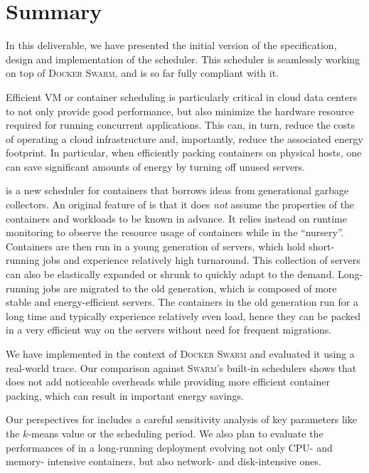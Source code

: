 
\chapter{Summary}
\label{chap:summ}

In this deliverable, we have presented the initial version of the specification, design and implementation of the \GP{} scheduler.
This scheduler is seamlessly working on top of \textsc{Docker Swarm}, and is so far fully compliant with it.

Efficient VM or container scheduling is particularly critical in cloud data centers to not only provide good performance, but also minimize the hardware resource required for running concurrent applications.
This can, in turn, reduce the costs of operating a cloud infrastructure and, importantly, reduce the associated energy footprint.
In particular, when efficiently packing containers on physical hosts, one can save significant amounts of energy by turning off unused servers.

\GP{} is a new scheduler for containers that borrows ideas from generational garbage collectors.
An original feature of \GP is that it does \emph{not} assume the properties of the containers and workloads to be known in advance.
It relies instead on runtime monitoring to observe the resource usage of containers while in the ``nursery''.
Containers are then run in a young generation of servers, which hold short-running jobs and experience relatively high turnaround.
This collection of servers can also be elastically expanded or shrunk to quickly adapt to the demand.
Long-running jobs are migrated to the old generation, which is composed of more stable and energy-efficient servers.
The containers in the old generation run for a long time and typically experience relatively even load, hence they can be packed in a very efficient way on the servers without need for frequent migrations.

We have implemented \GP in the context of \textsc{Docker Swarm} and evaluated it using a real-world trace.
Our comparison against \textsc{Swarm}'s built-in schedulers shows that \GP does not add noticeable overheads while providing more efficient container packing, which can result in important energy savings.

Our perspectives for \GP includes a careful sensitivity analysis of key parameters like the $k$-means value or the scheduling period.
We also plan to evaluate the performances of \GP in a long-running deployment evolving not only CPU- and memory- intensive containers, but also network- and disk-intensive ones.
